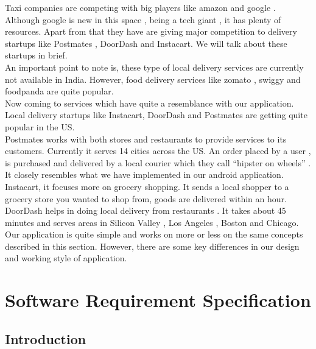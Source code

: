 \documentclass{report}
\begin{document}
\par Taxi companies are competing with big players like amazon and google . Although google is new in this space , being a tech giant , it has plenty of resources. Apart from that they have are giving major competition to delivery startups like Postmates\cite{c10} , DoorDash\cite{c5} and Instacart\cite{c4}. We will talk about these startups in brief.\\

An important point to note is, these type of local delivery services are currently not available in India. However, food delivery services like zomato , swiggy and foodpanda are quite popular.\\
Now coming to services which have quite a resemblance with our application.
Local delivery startups like Instacart\cite{c4}, DoorDash\cite{c5} and  Postmates are getting quite popular in the US.\\

Postmates works with both stores and restaurants to provide services to its customers. Currently it serves 14 cities across the US. An order placed by a user ,  is purchased and delivered by a local courier which they call “hipster on wheels” . It closely resembles what we have implemented in our android application. \\

Instacart\cite{c4}, it focuses more on grocery shopping. It sends a local shopper to a grocery store you wanted to shop from, goods are delivered within an hour.\\

DoorDash\cite{c5} helps in doing local delivery from restaurants . It takes about 45 minutes and serves areas in Silicon Valley , Los Angeles , Boston and Chicago.\\

Our application is quite simple and works on more or less on the same concepts described in this section. However, there are some key differences in our design and working style of application.\\


\chapter{Software Requirement Specification}
\section{Introduction}
\end{document}
